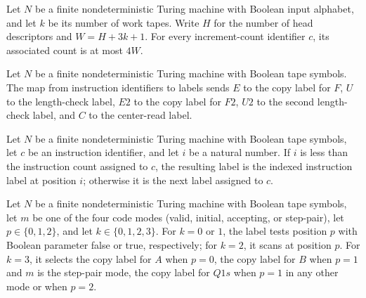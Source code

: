 \begin{lemma}
\label{Complexity.Codec.icCount_le}
\leanok
{}
Let $N$ be a finite nondeterministic Turing machine with Boolean input alphabet, and let
$k$ be its number of work tapes. Write $H$ for the number of head descriptors and
$W=H+3k+1$. For every increment-count identifier $c$, its associated count is at most
$4W$.
\end{lemma}

\begin{definition}
\label{Complexity.Codec.icNext}
\leanok
{}
Let $N$ be a finite nondeterministic Turing machine with Boolean tape symbols. The map
from instruction identifiers to labels sends $E$ to the copy label for $F$, $U$ to the
length-check label, $E2$ to the copy label for $F2$, $U2$ to the second length-check
label, and $C$ to the center-read label.
\end{definition}

\begin{definition}
\label{Complexity.Codec.icL}
\leanok
{}
Let $N$ be a finite nondeterministic Turing machine with Boolean tape symbols, let $c$
be an instruction identifier, and let $i$ be a natural number. If $i$ is less than the
instruction count assigned to $c$, the resulting label is the indexed instruction label
at position $i$; otherwise it is the next label assigned to $c$.
\end{definition}

\begin{definition}
\label{Complexity.Codec.prCont}
\leanok
{}
Let $N$ be a finite nondeterministic Turing machine with Boolean tape symbols, let $m$
be one of the four code modes (valid, initial, accepting, or step-pair), let
$p\in\{0,1,2\}$, and let $k\in\{0,1,2,3\}$. For $k=0$ or $1$, the label tests position
$p$ with Boolean parameter false or true, respectively; for $k=2$, it scans at position
$p$. For $k=3$, it selects the copy label for $A$ when $p=0$, the copy label for $B$
when $p=1$ and $m$ is the step-pair mode, the copy label for $Q1s$ when $p=1$ in any
other mode or when $p=2$.
\end{definition}

